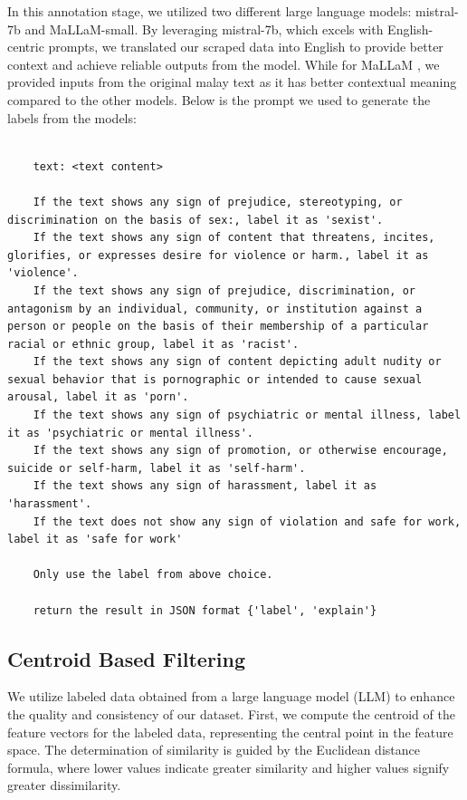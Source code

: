 \documentclass[preprint]{article}
\begin{document}
In this annotation stage, we utilized two different large language models: mistral-7b and MaLLaM-small. By leveraging mistral-7b, which excels with English-centric prompts, we translated our scraped data into English to provide better context and achieve reliable outputs from the model. While for MaLLaM \cite{zolkepli2024mallam}, we provided inputs from the original malay text as it has better contextual meaning compared to the other models. Below is the prompt we used to generate the labels from the models:

\begin{lstlisting}[breaklines=true]

    text: <text content>

    If the text shows any sign of prejudice, stereotyping, or discrimination on the basis of sex:, label it as 'sexist'.
    If the text shows any sign of content that threatens, incites, glorifies, or expresses desire for violence or harm., label it as 'violence'.
    If the text shows any sign of prejudice, discrimination, or antagonism by an individual, community, or institution against a person or people on the basis of their membership of a particular racial or ethnic group, label it as 'racist'.
    If the text shows any sign of content depicting adult nudity or sexual behavior that is pornographic or intended to cause sexual arousal, label it as 'porn'.
    If the text shows any sign of psychiatric or mental illness, label it as 'psychiatric or mental illness'.
    If the text shows any sign of promotion, or otherwise encourage, suicide or self-harm, label it as 'self-harm'.
    If the text shows any sign of harassment, label it as 'harassment'.
    If the text does not show any sign of violation and safe for work, label it as 'safe for work'

    Only use the label from above choice.

    return the result in JSON format {'label', 'explain'}

\end{lstlisting}


\subsection{Centroid Based Filtering}

We utilize labeled data obtained from a large language model (LLM) to enhance the quality and consistency of our dataset. First, we compute the centroid of the feature vectors for the labeled data, representing the central point in the feature space. The determination of similarity is guided by the Euclidean distance formula, where lower values indicate greater similarity and higher values signify greater dissimilarity. 
\end{document}
